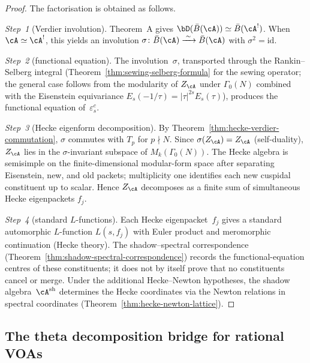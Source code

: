\begin{proof}
The factorisation is obtained as follows.

\smallskip
\emph{Step~1} \textup{(Verdier involution)}.
Theorem~A gives $\bD(\bar B(\cA)) \simeq \bar B(\cA^!)$.
When $\cA \simeq \cA^!$, this yields an involution
$\sigma\colon \bar B(\cA) \xrightarrow{\;\sim\;} \bar B(\cA)$
with $\sigma^2 = \mathrm{id}$.

\smallskip
\emph{Step~2} \textup{(functional equation)}.
The involution~$\sigma$, transported through the
Rankin--Selberg integral
(Theorem~\ref{thm:sewing-selberg-formula} for the
sewing operator; the general case follows from the
modularity of $Z_\cA$ under $\Gamma_0(N)$
combined with the Eisenstein equivariance
$E_s(-1/\tau) = |\tau|^{2s}E_s(\tau)$), produces the
functional equation of~$\varepsilon^c_s$.

\smallskip
\emph{Step~3} \textup{(Hecke eigenform decomposition)}.
By Theorem~\ref{thm:hecke-verdier-commutation},
$\sigma$ commutes with $T_p$ for $p\nmid N$. Since
$\sigma(Z_\cA) = Z_\cA$ (self-duality), $Z_\cA$ lies
in the $\sigma$-invariant subspace of $M_k(\Gamma_0(N))$.
The Hecke algebra is semisimple on the finite-dimensional modular-form
space after separating Eisenstein, new, and old packets; multiplicity
one identifies each new cuspidal constituent up to scalar. Hence
$Z_\cA$ decomposes as a finite sum of simultaneous Hecke eigenpackets
$f_j$.

\smallskip
\emph{Step~4} \textup{(standard $L$-functions)}.
Each Hecke eigenpacket~$f_j$ gives a standard automorphic
$L$-function $L(s,f_j)$ with Euler product and meromorphic
continuation (Hecke theory). The shadow--spectral correspondence
(Theorem~\ref{thm:shadow-spectral-correspondence}) records the
functional-equation centres of these constituents; it does not by
itself prove that no constituents cancel or merge.
Under the additional Hecke--Newton hypotheses, the shadow
algebra~$\cA^{\mathrm{sh}}$ determines the Hecke coordinates via
the Newton relations in spectral coordinates
(Theorem~\ref{thm:hecke-newton-lattice}).

\end{proof}

\subsection{The theta decomposition bridge for rational VOAs}

